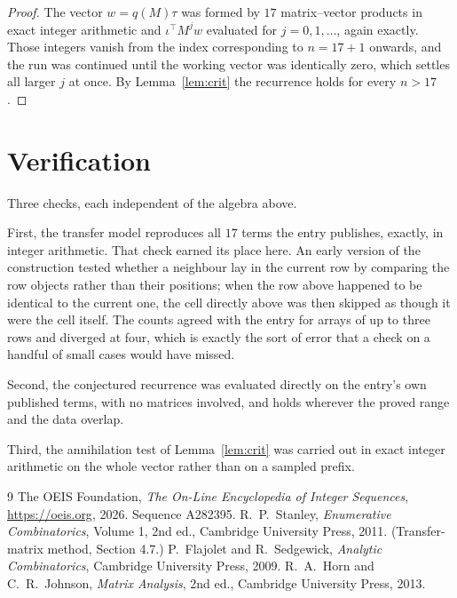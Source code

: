 \documentclass[11pt,a4paper]{article}
\theoremstyle{plain}
\theoremstyle{definition}
\begin{document}
\begin{proof}
The vector $w=q(M)\tau$ was formed by $17$ matrix--vector products in exact integer
arithmetic and $\iota^{\!\top}M^{j}w$ evaluated for $j=0,1,\dots$, again exactly. Those
integers vanish from the index corresponding to $n=17+1$ onwards, and the run was
continued until the working vector was identically zero, which settles all larger $j$ at once.
By Lemma~\ref{lem:crit} the recurrence holds for every $n>17$.
\end{proof}

\section{Verification}

Three checks, each independent of the algebra above.

First, the transfer model reproduces all $17$ terms the entry publishes, exactly, in
integer arithmetic. That check earned its place here. An early version of the construction
tested whether a neighbour lay in the current row by comparing the row objects rather
than their positions; when the row above happened to be identical to the current one, the
cell directly above was then skipped as though it were the cell itself. The counts agreed with
the entry for arrays of up to three rows and diverged at four, which is exactly the sort of
error that a check on a handful of small cases would have missed.

Second, the conjectured recurrence was evaluated directly on the entry's own published terms,
with no matrices involved, and holds wherever the proved range and the data overlap.

Third, the annihilation test of Lemma~\ref{lem:crit} was carried out in exact integer
arithmetic on the whole vector rather than on a sampled prefix.

\begin{thebibliography}{9}
 The OEIS Foundation, \emph{The On-Line Encyclopedia of Integer
Sequences}, \url{https://oeis.org}, 2026. Sequence A282395.
 R.~P.~Stanley, \emph{Enumerative Combinatorics}, Volume 1, 2nd ed.,
Cambridge University Press, 2011. (Transfer-matrix method, Section 4.7.)
 P.~Flajolet and R.~Sedgewick, \emph{Analytic Combinatorics}, Cambridge
University Press, 2009.
 R.~A.~Horn and C.~R.~Johnson, \emph{Matrix Analysis}, 2nd ed., Cambridge
University Press, 2013.
\end{thebibliography}
\end{document}
